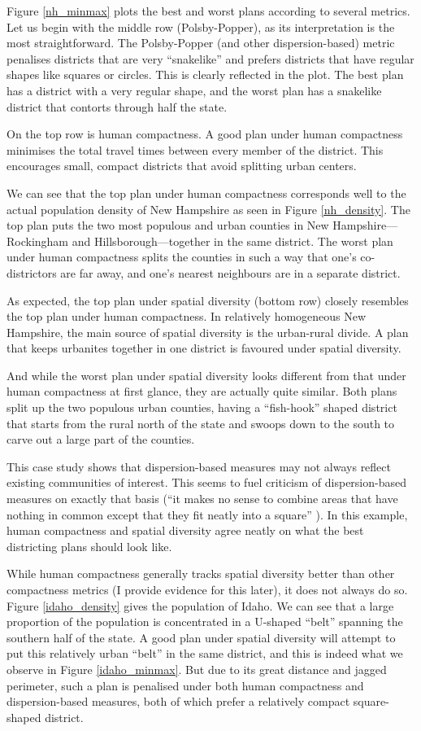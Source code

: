 \documentclass[]{article}
\begin{document}
Figure \ref{nh_minmax} plots the best and worst plans according to
several metrics. Let us begin with the middle row (Polsby-Popper), as
its interpretation is the most straightforward. The Polsby-Popper (and
other dispersion-based) metric penalises districts that are very
``snakelike'' and prefers districts that have regular shapes like
squares or circles. This is clearly reflected in the plot. The best plan
has a district with a very regular shape, and the worst plan has a
snakelike district that contorts through half the state.

On the top row is human compactness. A good plan under human compactness
minimises the total travel times between every member of the district.
This encourages small, compact districts that avoid splitting urban
centers.

We can see that the top plan under human compactness corresponds well to
the actual population density of New Hampshire as seen in Figure
\ref{nh_density}. The top plan puts the two most populous and urban
counties in New Hampshire---Rockingham and Hillsborough---together in
the same district. The worst plan under human compactness splits the
counties in such a way that one's co-districtors are far away, and one's
nearest neighbours are in a separate district.

As expected, the top plan under spatial diversity (bottom row) closely
resembles the top plan under human compactness. In relatively
homogeneous New Hampshire, the main source of spatial diversity is the
urban-rural divide. A plan that keeps urbanites together in one district
is favoured under spatial diversity.

And while the worst plan under spatial diversity looks different from
that under human compactness at first glance, they are actually quite
similar. Both plans split up the two populous urban counties, having a
``fish-hook'' shaped district that starts from the rural north of the
state and swoops down to the south to carve out a large part of the
counties.

This case study shows that dispersion-based measures may not always
reflect existing communities of interest. This seems to fuel criticism
of dispersion-based measures on exactly that basis (``it makes no sense
to combine areas that have nothing in common except that they fit neatly
into a square'' \citep{wolf2015}). In this example, human compactness
and spatial diversity agree neatly on what the best districting plans
should look like.

While human compactness generally tracks spatial diversity better than
other compactness metrics (I provide evidence for this later), it does
not always do so. Figure \ref{idaho_density} gives the population of
Idaho. We can see that a large proportion of the population is
concentrated in a U-shaped ``belt'' spanning the southern half of the
state. A good plan under spatial diversity will attempt to put this
relatively urban ``belt'' in the same district, and this is indeed what
we observe in Figure \ref{idaho_minmax}. But due to its great distance
and jagged perimeter, such a plan is penalised under both human
compactness and dispersion-based measures, both of which prefer a
relatively compact square-shaped district.
\end{document}

